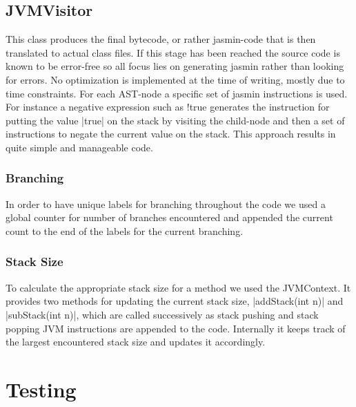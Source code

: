 \documentclass[paper=a4, fontsize=11pt]{scrartcl} %
\numberwithin{equation}{section} %
\numberwithin{figure}{section} %
\numberwithin{table}{section} %
\begin{document}
\subsection{JVMVisitor}

This class produces the final bytecode, or rather jasmin-code that is then translated to actual class files.
If this stage has been reached the source code is known to be error-free so all focus lies on generating jasmin rather than looking for errors.
No optimization is implemented at the time of writing, mostly due to time constraints.
For each AST-node a specific set of jasmin instructions is used.
For instance a negative expression such as !true generates the instruction for putting the value |true| on the stack by visiting the child-node and then a set of instructions to negate the current value on the stack.
This approach results in quite simple and manageable code.

\subsubsection*{Branching}

In order to have unique labels for branching throughout the code we used a global counter for number of branches encountered and appended the current count to the end of the labels for the current branching.

\subsubsection*{Stack Size}

To calculate the appropriate stack size for a method we used the JVMContext.
It provides two methods for updating the current stack size, |addStack(int n)| and |subStack(int n)|, which are called successively as stack pushing and stack popping JVM instructions are appended to the code.
Internally it keeps track of the largest encountered stack size and updates it accordingly.\\

\section{Testing}
\end{document}
